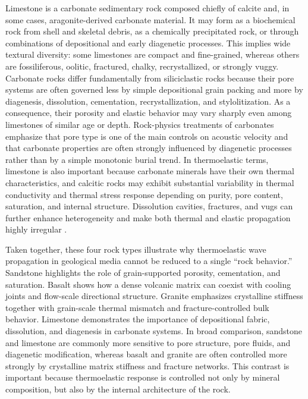 Limestone is a carbonate sedimentary rock composed chiefly of calcite and, in some cases, aragonite-derived carbonate material. It may form as a biochemical rock from shell and skeletal debris, as a chemically precipitated rock, or through combinations of depositional and early diagenetic processes. This implies wide textural diversity: some limestones are compact and fine-grained, whereas others are fossiliferous, oolitic, fractured, chalky, recrystallized, or strongly vuggy. Carbonate rocks differ fundamentally from siliciclastic rocks because their pore systems are often governed less by simple depositional grain packing and more by diagenesis, dissolution, cementation, recrystallization, and stylolitization. As a consequence, their porosity and elastic behavior may vary sharply even among limestones of similar age or depth. Rock-physics treatments of carbonates emphasize that pore type is one of the main controls on acoustic velocity and that carbonate properties are often strongly influenced by diagenetic processes rather than by a simple monotonic burial trend. In thermoelastic terms, limestone is also important because carbonate minerals have their own thermal characteristics, and calcitic rocks may exhibit substantial variability in thermal conductivity and thermal stress response depending on purity, pore content, saturation, and internal structure. Dissolution cavities, fractures, and vugs can further enhance heterogeneity and make both thermal and elastic propagation highly irregular \cite{moore2001,mavko2009,robertson1988}.

Taken together, these four rock types illustrate why thermoelastic wave propagation in geological media cannot be reduced to a single ``rock behavior.'' Sandstone highlights the role of grain-supported porosity, cementation, and saturation. Basalt shows how a dense volcanic matrix can coexist with cooling joints and flow-scale directional structure. Granite emphasizes crystalline stiffness together with grain-scale thermal mismatch and fracture-controlled bulk behavior. Limestone demonstrates the importance of depositional fabric, dissolution, and diagenesis in carbonate systems. In broad comparison, sandstone and limestone are commonly more sensitive to pore structure, pore fluids, and diagenetic modification, whereas basalt and granite are often controlled more strongly by crystalline matrix stiffness and fracture networks. This contrast is important because thermoelastic response is controlled not only by mineral composition, but also by the internal architecture of the rock.

